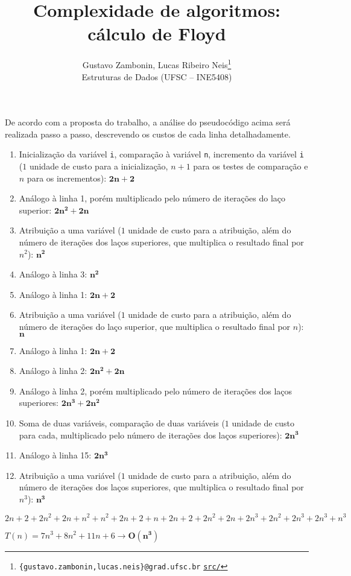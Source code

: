 \documentclass{article}
\title{\textbf{Complexidade de algoritmos: cálculo de Floyd}}
\author{
    Gustavo Zambonin, Lucas Ribeiro Neis\thanks{
        \texttt{\{gustavo.zambonin,lucas.neis\}@grad.ufsc.br} \hfill
        \texttt{\href{https://github.com/zambonin/ufsc-ine5408}{src/}}
    } \\
    \small{Estruturas de Dados (UFSC -- INE5408)}
}
\date{}
\begin{document}
\maketitle



De acordo com a proposta do trabalho, a análise do pseudocódigo acima será
realizada passo a passo, descrevendo os custos de cada linha detalhadamente.

\begin{enumerate}[label=Linha \arabic*:]

    \item Inicialização da variável \texttt{i}, comparação à variável
        \texttt{n}, incremento da variável \texttt{i} ($1$ unidade de custo
        para a inicialização, $n + 1$ para os testes de comparação e $n$
        para os incrementos): $\mathbf{2n + 2}$

    \item Análogo à linha 1, porém multiplicado pelo número de iterações
        do laço superior: $\mathbf{2n^2 + 2n}$

    \item Atribuição a uma variável ($1$ unidade de custo para a atribuição,
        além do número de iterações dos laços superiores, que multiplica o
        resultado final por $n^2$): $\mathbf{n^2}$

    \item Análogo à linha 3: $\mathbf{n^2}$ \addtocounter{enumi}{3}

    \item Análogo à linha 1: $\mathbf{2n + 2}$

    \item Atribuição a uma variável ($1$ unidade de custo para a atribuição,
        além do número de iterações do laço superior, que multiplica o
        resultado final por $n$): $\mathbf{n}$ \addtocounter{enumi}{2}

    \item Análogo à linha 1: $\mathbf{2n + 2}$

    \item Análogo à linha 2: $\mathbf{2n^2 + 2n}$

    \item Análogo à linha 2, porém multiplicado pelo número de iterações
        dos laços superiores: $\mathbf{2n^3 + 2n^2}$

    \item Soma de duas variáveis, comparação de duas variáveis ($1$ unidade
        de custo para cada, multiplicado pelo número de iterações dos laços
        superiores): $\mathbf{2n^3}$

    \item Análogo à linha 15: $\mathbf{2n^3}$

    \item Atribuição a uma variável ($1$ unidade de custo para a atribuição,
        além do número de iterações dos laços superiores, que multiplica o
        resultado final por $n^3$): $\mathbf{n^3}$

\end{enumerate}

$2n + 2 + 2n^2 + 2n + n^2 + n^2 + 2n + 2 + n + 2n + 2 + 2n^2 + 2n + 2n^3
+ 2n^2 + 2n^3 + 2n^3 + n^3$

$T(n) = 7n^3 + 8n^2 + 11n + 6 \rightarrow \mathbf{O(n^3)}$
\end{document}
